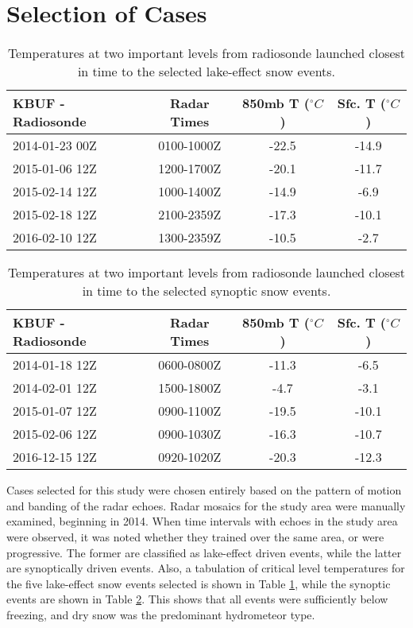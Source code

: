 \section{Selection of Cases}
\begin{table}[h]
    \caption{Temperatures at two important levels from radiosonde launched closest in time to the selected lake-effect snow events.}\label{eventslake}
    \begin{center}
    \begin{tabular}{|l|c|c|c|}
    \hline
     KBUF - Radiosonde & Radar Times & 850mb T ($^{\circ}C$) & Sfc. T ($^{\circ}C$)\\
    \hline\hline
    2014-01-23 00Z & 0100-1000Z & -22.5 & -14.9 \\
    \hline
    2015-01-06 12Z & 1200-1700Z & -20.1 & -11.7 \\
    \hline
    2015-02-14 12Z & 1000-1400Z & -14.9 & -6.9 \\
    \hline
    2015-02-18 12Z & 2100-2359Z & -17.3 & -10.1 \\
    \hline
    2016-02-10 12Z & 1300-2359Z & -10.5 & -2.7 \\
    \hline
    \end{tabular}
    \end{center}
\end{table}
\begin{table}[h]
    \caption{Temperatures at two important levels from radiosonde launched closest in time to the selected synoptic snow events.}\label{synopticevents}
    \begin{center}
    \begin{tabular}{|l|c|c|c|}
    \hline
     KBUF - Radiosonde & Radar Times & 850mb T ($^{\circ}C$) & Sfc. T ($^{\circ}C$)\\
    \hline\hline
    2014-01-18 12Z & 0600-0800Z & -11.3 & -6.5 \\
    \hline
    2014-02-01 12Z & 1500-1800Z & -4.7 & -3.1 \\
    \hline
    2015-01-07 12Z & 0900-1100Z & -19.5 & -10.1 \\
    \hline
    2015-02-06 12Z & 0900-1030Z & -16.3 & -10.7 \\
    \hline
    2016-12-15 12Z & 0920-1020Z & -20.3 & -12.3 \\
    \hline
    \end{tabular}
    \end{center}
\end{table}
Cases selected for this study were chosen entirely based on the pattern of motion and banding of the radar echoes. Radar mosaics for the study area were manually examined, beginning in 2014. When time intervals with echoes in the study area were observed, it was noted whether they trained over the same area, or were progressive. The former are classified as lake-effect driven events, while the latter are synoptically driven events. Also, a tabulation of critical level temperatures for the five lake-effect snow events selected is shown in Table \ref{eventslake}, while the synoptic events are shown in Table \ref{synopticevents}. This shows that all events were sufficiently below freezing, and dry snow was the predominant hydrometeor type.
